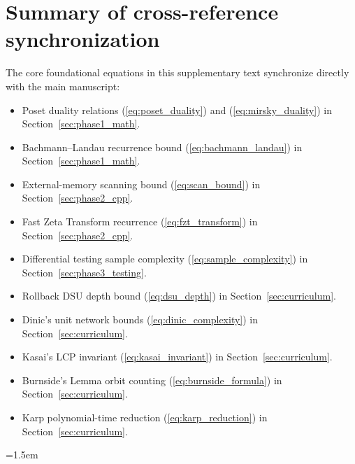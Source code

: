 \documentclass[11pt, letterpaper]{article}
\begin{document}
\section{Summary of cross-reference synchronization}
The core foundational equations in this supplementary text synchronize directly with the main manuscript:
\begin{itemize}
    \item Poset duality relations (\ref{eq:poset_duality}) and (\ref{eq:mirsky_duality}) in Section~\ref{sec:phase1_math}.
    \item Bachmann--Landau recurrence bound (\ref{eq:bachmann_landau}) in Section~\ref{sec:phase1_math}.
    \item External-memory scanning bound (\ref{eq:scan_bound}) in Section~\ref{sec:phase2_cpp}.
    \item Fast Zeta Transform recurrence (\ref{eq:fzt_transform}) in Section~\ref{sec:phase2_cpp}.
    \item Differential testing sample complexity (\ref{eq:sample_complexity}) in Section~\ref{sec:phase3_testing}.
    \item Rollback DSU depth bound (\ref{eq:dsu_depth}) in Section~\ref{sec:curriculum}.
    \item Dinic's unit network bounds (\ref{eq:dinic_complexity}) in Section~\ref{sec:curriculum}.
    \item Kasai's LCP invariant (\ref{eq:kasai_invariant}) in Section~\ref{sec:curriculum}.
    \item Burnside's Lemma orbit counting (\ref{eq:burnside_formula}) in Section~\ref{sec:curriculum}.
    \item Karp polynomial-time reduction (\ref{eq:karp_reduction}) in Section~\ref{sec:curriculum}.
\end{itemize}

\begingroup
\emergencystretch=1.5em
\printbibliography
\endgroup
\end{document}
